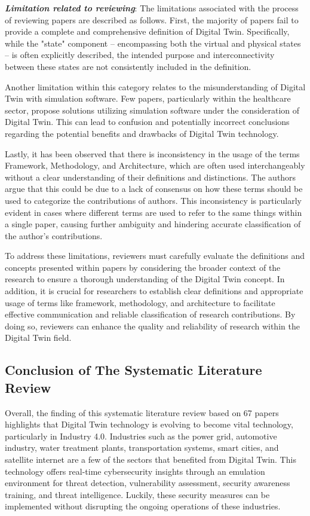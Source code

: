 \textbf{\textit{Limitation related to reviewing}}: The limitations associated with the process of reviewing papers are described as follows. First, the majority of papers fail to provide a complete and comprehensive definition of Digital Twin. Specifically, while the "state" component -- encompassing both the virtual and physical states -- is often explicitly described, the intended purpose and interconnectivity between these states are not consistently included in the definition.

Another limitation within this category relates to the misunderstanding of Digital Twin with simulation software. Few papers, particularly within the healthcare sector, propose solutions utilizing simulation software under the consideration of Digital Twin. This can lead to confusion and potentially incorrect conclusions regarding the potential benefits and drawbacks of Digital Twin technology.

 Lastly, it has been observed that there is inconsistency in the usage of the terms Framework, Methodology, and Architecture, which are often used interchangeably without a clear understanding of their definitions and distinctions. The authors argue that this could be due to a lack of consensus on how these terms should be used to categorize the contributions of authors. This inconsistency is particularly evident in cases where different terms are used to refer to the same things within a single paper, causing further ambiguity and hindering accurate classification of the author's contributions.

 To address these limitations, reviewers must carefully evaluate the definitions and concepts presented within papers by considering the broader context of the research to ensure a thorough understanding of the Digital Twin concept. In addition, it is crucial for researchers to establish clear definitions and appropriate usage of terms like framework, methodology, and architecture to facilitate effective communication and reliable classification of research contributions. By doing so, reviewers can enhance the quality and reliability of research within the Digital Twin field.


\subsection{Conclusion of The Systematic Literature Review}
Overall, the finding of this systematic literature review based on 67 papers highlights that Digital Twin technology is evolving to become vital technology, particularly in Industry 4.0. Industries such as the power grid, automotive industry, water treatment plants, transportation systems, smart cities, and satellite internet are a few of the sectors that benefited from Digital Twin. This technology offers real-time cybersecurity insights through an emulation environment for threat detection, vulnerability assessment, security awareness training, and threat intelligence. Luckily, these security measures can be implemented without disrupting the ongoing operations of these industries. 


